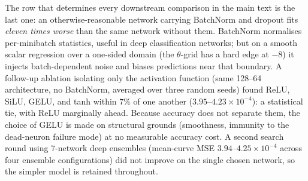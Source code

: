 \documentclass[11pt]{article}
\begin{document}
The row that determines every downstream comparison in the main text is the
last one: an otherwise-reasonable network carrying BatchNorm and dropout fits
\emph{eleven times worse} than the same network without them. BatchNorm
normalises per-minibatch statistics, useful in deep classification networks;
but on a smooth scalar regression over a one-sided domain (the $\theta$-grid
has a hard edge at $-8$) it injects batch-dependent noise and biases
predictions near that boundary. A follow-up ablation isolating only the
activation function (same 128--64 architecture, no BatchNorm, averaged over
three random seeds) found ReLU, SiLU, GELU, and tanh within $7\%$ of one
another ($3.95$--$4.23\times10^{-4}$): a statistical tie, with ReLU
marginally ahead. Because accuracy does not separate them, the choice of
GELU is made on structural grounds (smoothness, immunity to the dead-neuron
failure mode) at no measurable accuracy cost. A second search round using
$7$-network deep ensembles (mean-curve MSE $3.94$--$4.25\times10^{-4}$
across four ensemble configurations) did not improve on the single chosen
network, so the simpler model is retained throughout.

\begin{table}[h]
\centering
\caption{One-dimensional model: does capacity matter? Curve MSE is
against the denoised response curve, mean over three seeds. Downstream
MSE and 95\% CI length are DNN-ABC at the same scale as the main text's
mean-squared-error table ($40$ replicates/cell, full $p\times J$ grid), one
seed per row.}
\label{stab:capacity1D}
\setlength{\tabcolsep}{4.5pt}
\end{table}
\end{document}
